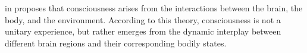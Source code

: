 \documentclass[a4paper]{article}
\title{}
\date{}
\begin{document}
    \maketitle
    in \cite{damasio-1999-the-feeling-of-what-happens} proposes that consciousness arises from the interactions between the brain, the body, and the environment. According to this theory, consciousness is not a unitary experience, but rather emerges from the dynamic interplay between different brain regions and their corresponding bodily states.
     
     
\end{document}
